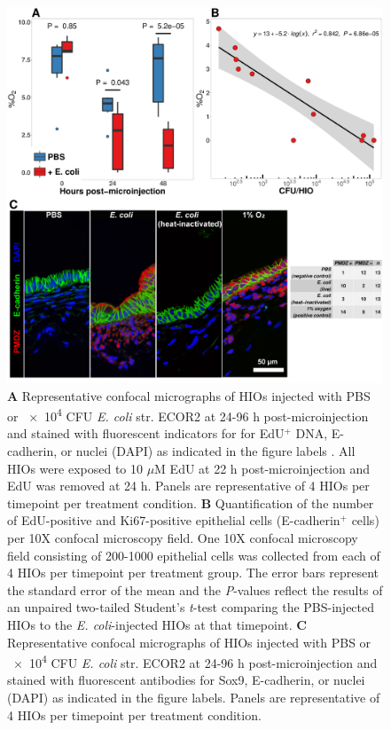 \documentclass[9pt,lineo]{elife}
\begin{document}
\begin{figure}
\begin{fullwidth}
\centering
\includegraphics[width=0.95\linewidth]{./figures/figure3/figure3_multipanel.pdf}
\caption{\textbf{A} Representative confocal micrographs of HIOs injected with PBS or \num{e4} CFU \textit{E. coli} str. ECOR2 at 24-96 h post-microinjection and stained with fluorescent indicators for for EdU$^{+}$ DNA, E-cadherin, or nuclei (DAPI) as indicated in the figure labels . All HIOs were exposed to 10 $\mu$M EdU at 22 h post-microinjection and EdU was removed at 24 h. Panels are representative of 4 HIOs per timepoint per treatment condition. \textbf{B} Quantification of the number of EdU-positive and Ki67-positive epithelial cells (E-cadherin$^{+}$ cells) per 10X confocal microscopy field. One 10X confocal microscopy field consisting of 200-1000 epithelial cells was collected from each of 4 HIOs per timepoint per treatment group. The error bars represent the standard error of the mean and the \textit{P}-values reflect the results of an unpaired two-tailed Student's \textit{t}-test comparing the PBS-injected HIOs to the \textit{E. coli}-injected HIOs at that timepoint. \textbf{C} Representative confocal micrographs of HIOs injected with PBS or \num{e4} CFU \textit{E. coli} str. ECOR2 at 24-96 h post-microinjection and stained with fluorescent antibodies for Sox9, E-cadherin, or nuclei (DAPI) as indicated in the figure labels. Panels are representative of 4 HIOs per timepoint per treatment condition.}
\label{fig:fullwidth}
\end{fullwidth}
\end{figure}
\end{document}
